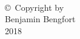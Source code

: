 
\thispagestyle{empty}
\hbox{\ }

\vfill
\renewcommand{\baselinestretch}{1}
\small\normalsize

\vspace{-.65in}

\begin{center}
\large{\copyright \hbox{ }Copyright by\\
Benjamin Bengfort  %
\\
2018}
\end{center}

\vfill

\newpage

\hbox{\ }
\newpage
